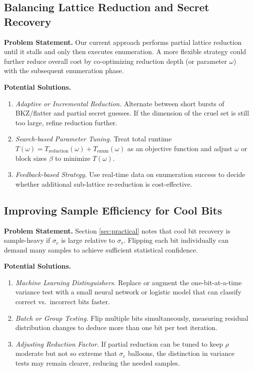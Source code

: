 \documentclass[11pt]{article}
\begin{document}
\subsection{Balancing Lattice Reduction and Secret Recovery}

\noindent \textbf{Problem Statement.}
Our current approach performs partial lattice reduction until it stalls and only then executes enumeration. A more flexible strategy could further reduce overall cost by co-optimizing reduction depth (or parameter $\omega$) with the subsequent enumeration phase.

\noindent \textbf{Potential Solutions.}
\begin{enumerate}
\item \emph{Adaptive or Incremental Reduction.} Alternate between short bursts of BKZ/flatter and partial secret guesses. If the dimension of the cruel set is still too large, refine reduction further.
\item \emph{Search-based Parameter Tuning.} Treat total runtime $T(\omega) = T_{\mathrm{reduction}}(\omega) + T_{\mathrm{enum}}(\omega)$ as an objective function and adjust $\omega$ or block sizes $\beta$ to minimize $T(\omega)$.
\item \emph{Feedback-based Strategy.} Use real-time data on enumeration success to decide whether additional sub-lattice re-reduction is cost-effective.
\end{enumerate}

\subsection{Improving Sample Efficiency for Cool Bits}

\noindent \textbf{Problem Statement.}
Section \ref{sec:practical} notes that cool bit recovery is sample-heavy if $\sigma_e$ is large relative to $\sigma_r$. Flipping each bit individually can demand many samples to achieve sufficient statistical confidence.

\noindent \textbf{Potential Solutions.}
\begin{enumerate}
\item \emph{Machine Learning Distinguishers.} Replace or augment the one-bit-at-a-time variance test with a small neural network or logistic model that can classify correct vs.\ incorrect bits faster.
\item \emph{Batch or Group Testing.} Flip multiple bits simultaneously, measuring residual distribution changes to deduce more than one bit per test iteration.
\item \emph{Adjusting Reduction Factor.} If partial reduction can be tuned to keep $\rho$ moderate but not so extreme that $\sigma_e$ balloons, the distinction in variance tests may remain clearer, reducing the needed samples.
\end{enumerate}
\end{document}
